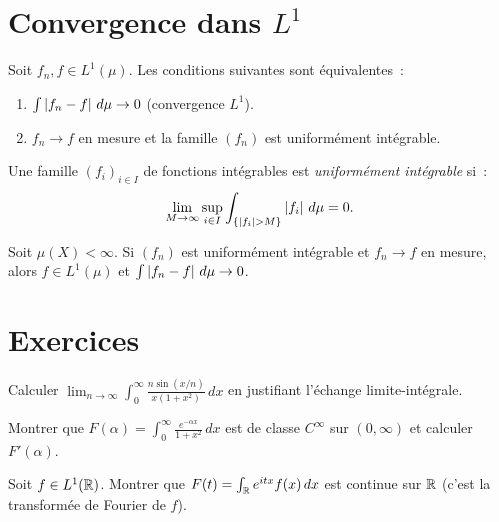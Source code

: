 \section{Convergence dans $L^1$}

\begin{theoreme}
Soit $f_n, f \in L^1(\mu)$. Les conditions suivantes sont \'equivalentes~:
\begin{enumerate}
    \item $\int \left| f_n - f \right|\, d\mu \to 0$ (convergence $L^1$).
    \item $f_n \to f$ en mesure et la famille $(f_n)$ est uniform\'ement
    int\'egrable.
\end{enumerate}
\end{theoreme}

\begin{definition}
Une famille $(f_i)_{i \in I}$ de fonctions int\'egrables est \emph{uniform\'ement
int\'egrable} si~:
\[
\lim_{M \to \infty} \sup_{i \in I} \int_{\{\left| f_i \right| > M\}} \left| f_i \right|\, d\mu = 0.
\]
\end{definition}

\begin{theoreme}[Vitali]
\label{thm:vitali_convergence}
Soit $\mu(X) < \infty$. Si $(f_n)$ est uniform\'ement int\'egrable et $f_n \to f$
en mesure, alors $f \in L^1(\mu)$ et $\int \left| f_n - f \right|\, d\mu \to 0$.
\end{theoreme}

\section{Exercices}

\begin{exercice}
Calculer $\lim_{n \to \infty} \int_0^{\infty}
\frac{n \sin(x/n)}{x(1 + x^2)}\, dx$ en justifiant l'\'echange limite-int\'egrale.
\end{exercice}

\begin{exercice}
Montrer que $F(\alpha) = \int_0^{\infty} \frac{e^{-\alpha x}}{1 + x^2}\, dx$ est
de classe $C^\infty$ sur $(0, \infty)$ et calculer $F'(\alpha)$.
\end{exercice}

\begin{exercice}
Soit $f \in L^1(\mathbb{R})$. Montrer que $F(t) = \int_{\mathbb{R}} e^{itx} f(x)\, dx$ est
continue sur $\mathbb{R}$ (c'est la transform\'ee de Fourier de $f$).
\end{exercice}

